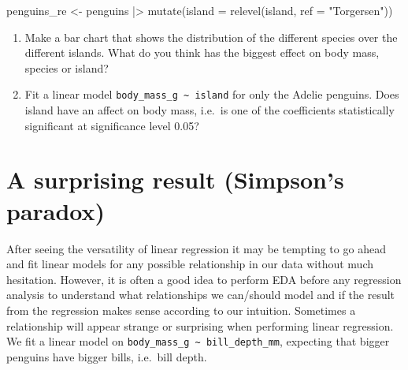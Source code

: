 \documentclass[
  letterpaper,
  DIV=11,
  numbers=noendperiod]{scrreprt}
\newenvironment{Shaded}{\begin{snugshade}}{\end{snugshade}}
\newcommand{\AttributeTok}[1]{\textcolor[rgb]{0.40,0.45,0.13}{#1}}
\newcommand{\FunctionTok}[1]{\textcolor[rgb]{0.28,0.35,0.67}{#1}}
\newcommand{\NormalTok}[1]{\textcolor[rgb]{0.00,0.23,0.31}{#1}}
\newcommand{\OtherTok}[1]{\textcolor[rgb]{0.00,0.23,0.31}{#1}}
\newcommand{\SpecialCharTok}[1]{\textcolor[rgb]{0.37,0.37,0.37}{#1}}
\newcommand{\StringTok}[1]{\textcolor[rgb]{0.13,0.47,0.30}{#1}}
\providecommand{\tightlist}{%
  \setlength{\itemsep}{0pt}\setlength{\parskip}{0pt}}\usepackage{longtable,booktabs,array}
\begin{document}
\begin{Shaded}
\begin{Highlighting}[]
\NormalTok{penguins\_re }\OtherTok{\textless{}{-}}\NormalTok{ penguins }\SpecialCharTok{|\textgreater{}} \FunctionTok{mutate}\NormalTok{(}\AttributeTok{island =} \FunctionTok{relevel}\NormalTok{(island, }\AttributeTok{ref =} \StringTok{"Torgersen"}\NormalTok{))}
\end{Highlighting}
\end{Shaded}

\begin{enumerate}
\def\labelenumi{\arabic{enumi}.}
\setcounter{enumi}{2}
\tightlist
\item
  Make a bar chart that shows the distribution of the different species
  over the different islands. What do you think has the biggest effect
  on body mass, species or island?
\item
  Fit a linear model \texttt{body\_mass\_g\ \textasciitilde{}\ island}
  for only the Adelie penguins. Does island have an affect on body mass,
  i.e.~is one of the coefficients statistically significant at
  significance level 0.05?
\end{enumerate}

\section{A surprising result (Simpson's
paradox)}\label{a-surprising-result-simpsons-paradox}

After seeing the versatility of linear regression it may be tempting to
go ahead and fit linear models for any possible relationship in our data
without much hesitation. However, it is often a good idea to perform EDA
before any regression analysis to understand what relationships we
can/should model and if the result from the regression makes sense
according to our intuition. Sometimes a relationship will appear strange
or surprising when performing linear regression. We fit a linear model
on \texttt{body\_mass\_g\ \textasciitilde{}\ bill\_depth\_mm}, expecting
that bigger penguins have bigger bills, i.e.~bill depth.

\begin{Shaded}
\end{Shaded}
\end{document}
